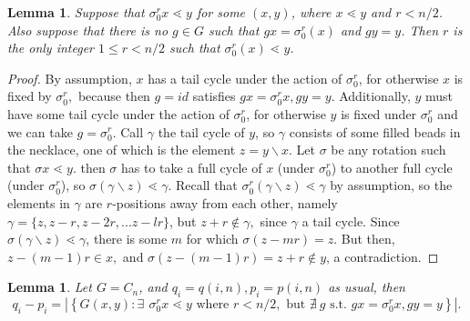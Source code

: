 \documentclass[10 pt]{amsart}
\theoremstyle{plain}
\newtheorem{lem}[thm]{Lemma}
\theoremstyle{definition}
\theoremstyle{remark}
\numberwithin{equation}{section}
\newcommand{\minus}{\backslash}
\begin{document}
\begin{lem}{\label{lem:cyclic_bound_r}}
Suppose that $\sigma_0^r x \lessdot y$ for some $(x,y)$, where $x \lessdot y$ and $r < n/2$. Also suppose that there is no $g \in G$ such that $g x = \sigma_0^r (x)$ and $gy = y$. Then $r$ is the only integer $1 \le r < n/2$ such that $\sigma_0^r (x) \lessdot y$. 
\end{lem}
\begin{proof}

By assumption, $x$ has a tail cycle under the action of $\sigma_0^{r}$, for otherwise $x$ is fixed by $\sigma_0^r,$ because then $g = id$ satisfies $gx = \sigma_0^rx,gy = y.$ Additionally, $y$ must have some tail cycle under the action of $\sigma_0^r$, for otherwise $y$ is fixed under $\sigma_0^r$  and we can take $g = \sigma_0^r$.  Call $\gamma$ the tail cycle of $y$, so $\gamma$ consists of some filled beads in the necklace, one of which is the element $z = y \minus x$. Let $\sigma$ be any rotation such that $\sigma x \lessdot y$. then $\sigma$ has to take a full cycle of $x$ (under $\sigma_0^r$) to another full cycle (under $\sigma_0^r$), so $\sigma (\gamma \minus z) \lessdot \gamma$. Recall that $\sigma_0^r (\gamma \minus z) \lessdot \gamma$ by assumption, so the elements in $\gamma$ are $r$-positions away from each other, namely $\gamma = \{ z, z-r, z-2r, ... z -l r\}$, but $z+r \notin \gamma,$ since $\gamma$ a tail cycle. Since $\sigma (\gamma \minus z) \lessdot \gamma$, there is some $m$ for which $\sigma(z - m r) = z$. But then, $z-(m-1)r \in x,$ and $\sigma(z - (m-1)r) = z+r \notin y$, a contradiction. 
\end{proof}

\begin{lem}{\label{lem:cyclic_counting_difference}} 
Let $G= C_n$, and $q_i = q(i, n), p_i = p(i, n)$ as usual, 
then $$q_i - p_i = |\left\{G{(x, y)} : \exists \: \, \sigma_0^r x \lessdot y \text{ where } r < n/2, \text{ but } \nexists \:  g \text{ s.t. } g x = \sigma_0 ^r x, g y = y \right\}|.$$
\end{lem}
\end{document}
